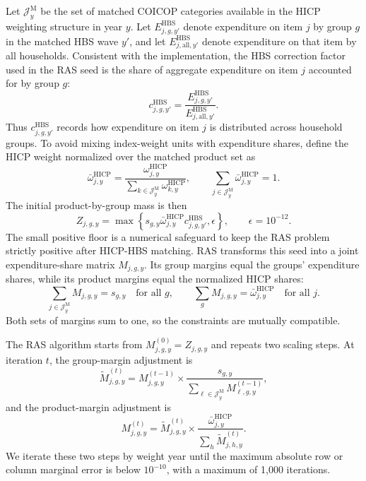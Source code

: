 \documentclass[11pt]{article}
\begin{document}
Let $\mathcal{J}_y^{\mathrm M}$ be the set of matched COICOP categories available in the HICP weighting
structure in year $y$. Let $E^{\mathrm{HBS}}_{j,g,y'}$ denote expenditure on item $j$ by group $g$ in the
matched HBS wave $y'$, and let $E^{\mathrm{HBS}}_{j,\mathrm{all},y'}$ denote expenditure on that item by all
households. Consistent with the implementation, the HBS correction factor used in the RAS seed is
the share of aggregate expenditure on item $j$ accounted for by group $g$:
\begin{equation}
c^{\mathrm{HBS}}_{j,g,y'}
=
\frac{E^{\mathrm{HBS}}_{j,g,y'}}{E^{\mathrm{HBS}}_{j,\mathrm{all},y'}}.
\end{equation}
Thus $c^{\mathrm{HBS}}_{j,g,y'}$ records how expenditure on item $j$ is distributed across household groups.
To avoid mixing index-weight units with expenditure shares, define the HICP weight normalized over
the matched product set as
\begin{equation}
\bar{\omega}^{\mathrm{HICP}}_{j,y}
=
\frac{\omega^{\mathrm{HICP}}_{j,y}}
{\sum_{k \in \mathcal{J}_y^{\mathrm M}}\omega^{\mathrm{HICP}}_{k,y}},
\qquad
\sum_{j \in \mathcal{J}_y^{\mathrm M}}\bar{\omega}^{\mathrm{HICP}}_{j,y}=1.
\end{equation}
The initial product-by-group mass is then
\begin{equation}
Z_{j,g,y}
=
\max\left\{
s_{g,y}\bar{\omega}^{\mathrm{HICP}}_{j,y}c^{\mathrm{HBS}}_{j,g,y'},\epsilon
\right\},
\qquad
\epsilon=10^{-12}.
\end{equation}
The small positive floor is a numerical safeguard to keep the RAS problem strictly positive
after HICP-HBS matching. RAS transforms this seed into a joint expenditure-share matrix
$M_{j,g,y}$. Its group margins equal the groups' expenditure shares, while its product margins equal
the normalized HICP shares:
\begin{equation}
\sum_{j \in \mathcal{J}_y^{\mathrm M}} M_{j,g,y}
=
s_{g,y}
\quad \text{for all } g,
\qquad
\sum_g M_{j,g,y}
=
\bar{\omega}^{\mathrm{HICP}}_{j,y}
\quad \text{for all } j.
\end{equation}
Both sets of margins sum to one, so the constraints are mutually compatible.

The RAS algorithm starts from $M^{(0)}_{j,g,y}=Z_{j,g,y}$ and repeats two scaling steps. At
iteration $t$, the group-margin adjustment is
\begin{equation}
\widetilde{M}^{(t)}_{j,g,y}
=
M^{(t-1)}_{j,g,y}
\times
\frac{
s_{g,y}
}{
\sum_{\ell \in \mathcal{J}_y^{\mathrm M}} M^{(t-1)}_{\ell,g,y}
},
\end{equation}
and the product-margin adjustment is
\begin{equation}
M^{(t)}_{j,g,y}
=
\widetilde{M}^{(t)}_{j,g,y}
\times
\frac{
\bar{\omega}^{\mathrm{HICP}}_{j,y}
}{
\sum_h \widetilde{M}^{(t)}_{j,h,y}
}.
\end{equation}
We iterate these two steps by weight year until the maximum absolute row or column marginal error is
below $10^{-10}$, with a maximum of 1,000 iterations.
\end{document}
